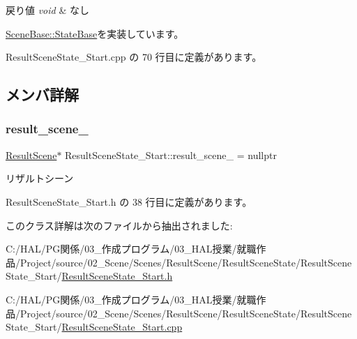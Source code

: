 \begin{DoxyRetVals}{戻り値}
{\em void} & なし \\
\hline
\end{DoxyRetVals}


\mbox{\hyperlink{class_scene_base_1_1_state_base_ad2c6c8fd9f020eb02f64f394edee129c}{Scene\+Base\+::\+State\+Base}}を実装しています。



 Result\+Scene\+State\+\_\+\+Start.\+cpp の 70 行目に定義があります。



\subsection{メンバ詳解}
\mbox{\label{class_result_scene_state___start_a223a52e93231e460dad3401a1a49931d}} 
\subsubsection{\texorpdfstring{result\+\_\+scene\+\_\+}{result\_scene\_}}
{\footnotesize\ttfamily \mbox{\hyperlink{class_result_scene}{Result\+Scene}}$\ast$ Result\+Scene\+State\+\_\+\+Start\+::result\+\_\+scene\+\_\+ = nullptr\hspace{0.3cm}{\ttfamily [private]}}



リザルトシーン 



 Result\+Scene\+State\+\_\+\+Start.\+h の 38 行目に定義があります。



このクラス詳解は次のファイルから抽出されました\+:\begin{DoxyCompactItemize}
\item 
C\+:/\+H\+A\+L/\+P\+G関係/03\+\_\+作成プログラム/03\+\_\+\+H\+A\+L授業/就職作品/\+Project/source/02\+\_\+\+Scene/\+Scenes/\+Result\+Scene/\+Result\+Scene\+State/\+Result\+Scene\+State\+\_\+\+Start/\mbox{\hyperlink{_result_scene_state___start_8h}{Result\+Scene\+State\+\_\+\+Start.\+h}}\item 
C\+:/\+H\+A\+L/\+P\+G関係/03\+\_\+作成プログラム/03\+\_\+\+H\+A\+L授業/就職作品/\+Project/source/02\+\_\+\+Scene/\+Scenes/\+Result\+Scene/\+Result\+Scene\+State/\+Result\+Scene\+State\+\_\+\+Start/\mbox{\hyperlink{_result_scene_state___start_8cpp}{Result\+Scene\+State\+\_\+\+Start.\+cpp}}\end{DoxyCompactItemize}
